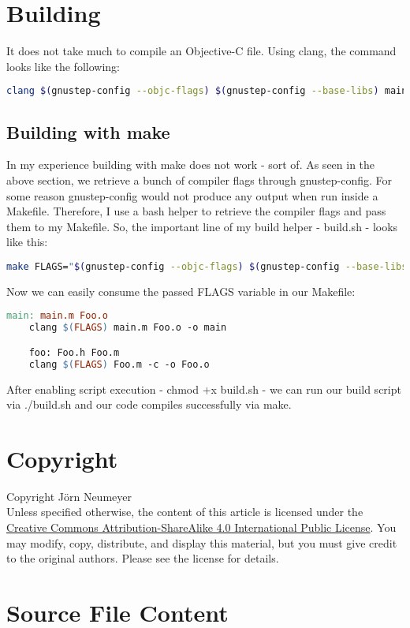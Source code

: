 \documentclass{article}
\begin{document}
  \section{Building}
  It does not take much to compile an Objective-C file.
  Using clang, the command looks like the following:
  \begin{lstlisting}[language=bash]
    clang $(gnustep-config --objc-flags) $(gnustep-config --base-libs) main.m Foo.m
  \end{lstlisting}
  \subsection{Building with make}
  In my experience building with make does not work - sort of.
  As seen in the above section, we retrieve a bunch of compiler flags through gnustep-config.
  For some reason gnustep-config would not produce any output when run inside a Makefile.
  Therefore, I use a bash helper to retrieve the compiler flags and pass them to my Makefile.
  So, the important line of my build helper - build.sh - looks like this:
  \begin{lstlisting}[language=bash]
    make FLAGS="$(gnustep-config --objc-flags) $(gnustep-config --base-libs)"
  \end{lstlisting}
  Now we can easily consume the passed FLAGS variable in our Makefile:
  \begin{lstlisting}[language=make]
    main: main.m Foo.o
    clang $(FLAGS) main.m Foo.o -o main

    foo: Foo.h Foo.m
    clang $(FLAGS) Foo.m -c -o Foo.o
  \end{lstlisting}
  After enabling script execution - chmod +x build.sh - we can run our build script via ./build.sh and our code compiles successfully via make.
  \section{Copyright}
  Copyright \textcopyright {} J\"orn Neumeyer\\
  Unless specified otherwise, the content of this article is licensed under the \href{https://creativecommons.org/licenses/by-sa/4.0/}{Creative Commons Attribution-ShareAlike 4.0 International Public License}.
  You may modify, copy, distribute, and display this material, but you must give credit to the original authors. Please see the license for details.
  \newpage
  \section{Source File Content}
  
  
  
  
  \newpage
  
\end{document}
